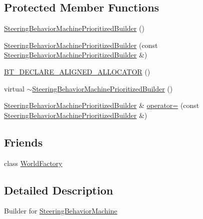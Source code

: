 \subsection*{Protected Member Functions}
\begin{DoxyCompactItemize}
\item 
\mbox{\hyperlink{classnjli_1_1_steering_behavior_machine_prioritized_builder_a923792b58a6c8c24f33a6656eec1cabd}{Steering\+Behavior\+Machine\+Prioritized\+Builder}} ()
\item 
\mbox{\hyperlink{classnjli_1_1_steering_behavior_machine_prioritized_builder_a2f60d20caa00c606f02de03c6950bf56}{Steering\+Behavior\+Machine\+Prioritized\+Builder}} (const \mbox{\hyperlink{classnjli_1_1_steering_behavior_machine_prioritized_builder}{Steering\+Behavior\+Machine\+Prioritized\+Builder}} \&)
\item 
\mbox{\hyperlink{classnjli_1_1_steering_behavior_machine_prioritized_builder_a1645a7651ebc5c50b7b5e515f0a6b811}{B\+T\+\_\+\+D\+E\+C\+L\+A\+R\+E\+\_\+\+A\+L\+I\+G\+N\+E\+D\+\_\+\+A\+L\+L\+O\+C\+A\+T\+OR}} ()
\item 
virtual \mbox{\hyperlink{classnjli_1_1_steering_behavior_machine_prioritized_builder_a68402a48edc8abe30c17b83342ad2963}{$\sim$\+Steering\+Behavior\+Machine\+Prioritized\+Builder}} ()
\item 
\mbox{\hyperlink{classnjli_1_1_steering_behavior_machine_prioritized_builder}{Steering\+Behavior\+Machine\+Prioritized\+Builder}} \& \mbox{\hyperlink{classnjli_1_1_steering_behavior_machine_prioritized_builder_aea975281872eada31c4494df16f3471c}{operator=}} (const \mbox{\hyperlink{classnjli_1_1_steering_behavior_machine_prioritized_builder}{Steering\+Behavior\+Machine\+Prioritized\+Builder}} \&)
\end{DoxyCompactItemize}
\subsection*{Friends}
\begin{DoxyCompactItemize}
\item 
class \mbox{\hyperlink{classnjli_1_1_steering_behavior_machine_prioritized_builder_acb96ebb09abe8f2a37a915a842babfac}{World\+Factory}}
\end{DoxyCompactItemize}


\subsection{Detailed Description}
Builder for \mbox{\hyperlink{classnjli_1_1_steering_behavior_machine}{Steering\+Behavior\+Machine}} 

